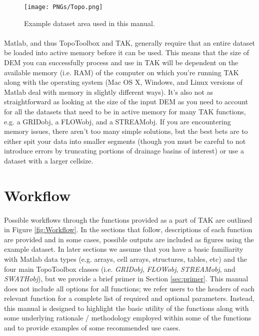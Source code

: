 \begin{figure}[H]
	\texttt{[image: PNGs/Topo.png]}
	\caption{Example dataset area used in this manual.}
	\label{fig:Topo}
\end{figure}

\paragraph{}Matlab, and thus TopoToolbox and TAK, generally require that an entire dataset be loaded into active memory before it can be used. This means that the size of DEM you can successfully process and use in TAK will be dependent on the available memory (i.e. RAM) of the computer on which you're running TAK along with the operating system (Mac OS X, Windows, and Linux versions of Matlab deal with memory in slightly different ways). It's also not as straightforward as looking at the size of the input DEM as you need to account for all the datasets that need to be in active memory for many TAK functions, e.g. a GRIDobj, a FLOWobj, and a STREAMobj. If you are encountering memory issues, there aren't too many simple solutions, but the best bets are to either spit your data into smaller segments (though you must be careful to not introduce errors by truncating portions of drainage basins of interest) or use a dataset with a larger cellsize. 

\section{Workflow} \label{sec:workflow}

\paragraph{}Possible workflows through the functions provided as a part of TAK are outlined in Figure \ref{fig:Workflow}. In the sections that follow, descriptions of each function are provided and in some cases, possible outputs are included as figures using the example dataset. In later sections we assume that you have a basic familiarity with Matlab data types (e.g. arrays, cell arrays, structures, tables, etc) and the four main TopoToolbox classes (i.e. \textit{GRIDobj}, \textit{FLOWobj}, \textit{STREAMobj}, and \textit{SWATHobj}), but we provide a brief primer in Section \ref{sec:primer}. This manual does not include all options for all functions; we refer users to the headers of each relevant function for a complete list of required and optional parameters. Instead, this manual is designed to highlight the basic utility of the functions along with some underlying rationale / methodology employed within some of the functions and to provide examples of some recommended use cases.

